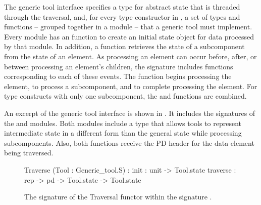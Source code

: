The generic tool interface specifies a type for abstract state that is
threaded through the traversal, and, for every type constructor in
\padsml{}, a set of types and functions -- grouped together in a
module -- that a generic tool must implement. Every module has an
 function to create an initial state object for data
processed by that module. In addition, a  function
retrieves the state of a subcomponent from the state of an element. As
processing an element can occur before, after, or between processing
an element's children, the signature includes functions corresponding
to each of these events. The function  begins processing the
element,  to process a subcomponent, and 
to complete processing the element. For type constructs with only one
subcomponent, the  and  functions are combined.


An excerpt of the generic tool interface is shown in
. It includes the signatures of the
 and  modules. Both modules include a type
 that allows tools to represent intermediate state
in a different form than the general state while processing
subcomponents. Also, both  functions receive the PD header
for the data element being traversed.

\begin{figure}
\begin{code}\scriptsize
   Traverse (Tool : Generic_tool.S) :
     init : unit -> Tool.state
     traverse : rep -> pd -> Tool.state -> Tool.state
\end{code}
\caption{The signature of the Traversal functor within the signature .}
\label{fig:traversal-interface}
\end{figure}

